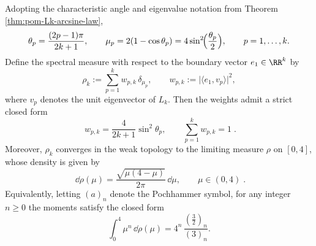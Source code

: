 
\begin{theorem}\label{thm:pom-Lk-boundary-spectral-measure-beta32}
Adopting the characteristic angle and eigenvalue notation from Theorem \ref{thm:pom-Lk-arcsine-law},
\[
\theta_p=\frac{(2p-1)\pi}{2k+1},
\qquad
\mu_p=2(1-\cos\theta_p)=4\sin^2\!\Bigl(\frac{\theta_p}{2}\Bigr),
\qquad p=1,\dots,k.
\]
Define the spectral measure with respect to the boundary vector \(e_1\in\RR^k\) by
\[
\rho_k:=\sum_{p=1}^{k} w_{p,k}\,\delta_{\mu_p},
\qquad
w_{p,k}:=\bigl|\langle e_1,v_p\rangle\bigr|^2,
\]
where \(v_p\) denotes the unit eigenvector of \(L_k\).
Then the weights admit a strict closed form
\[
\boxed{\;
w_{p,k}=\frac{4}{2k+1}\sin^2\theta_p,
\qquad \sum_{p=1}^{k} w_{p,k}=1\; }.
\]
Moreover, \(\rho_k\) converges in the weak topology to the limiting measure \(\rho\) on \([0,4]\), whose density is given by
\[
\boxed{\;
\dd\rho(\mu)=\frac{\sqrt{\mu(4-\mu)}}{2\pi}\,\dd\mu,\qquad \mu\in(0,4)\; }.
\]
Equivalently, letting \((a)_n\) denote the Pochhammer symbol, for any integer \(n\ge 0\) the moments satisfy the closed form
\[
\int_{0}^{4}\mu^{n}\,\dd\rho(\mu)=4^{n}\,\frac{(\tfrac32)_n}{(3)_n}.
\]
\end{theorem}

